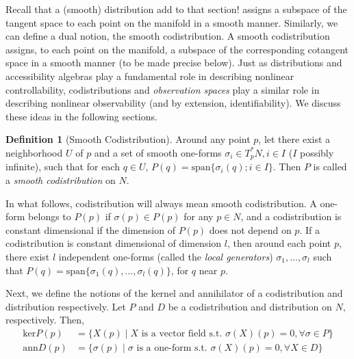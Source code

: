 \documentclass[psamsfonts]{amsart}
\theoremstyle{definition}
\newtheorem{defn}[thm]{Definition}
\theoremstyle{remark}
\numberwithin{equation}{section}
\begin{document}
Recall that a (smooth) distribution {\color{red}add to that section!} assigns a subspace of the tangent space to each point on the manifold in a smooth manner. Similarly, we can define a dual notion, the smooth codistribution. A smooth codistribution assigns, to each point on the manifold, a subspace of the corresponding cotangent space in a smooth manner (to be made precise below). Just as distributions and accessibility algebras play a fundamental role in describing nonlinear controllability, codistributions and \textit{observation spaces} play a similar role in describing nonlinear observability (and by extension, identifiability). We discuss these ideas in the following sections. 

\begin{defn}[Smooth Codistribution]
Around any point $p$, let there exist a neighborhood $U$ of $p$ and a set of smooth one-forms $\sigma_i \in T^*_pN, i\in I$ ($I$ possibly infinite), such that for each $q \in U$, $P(q) = \text{span}\{\sigma_i(q); i \in I\}$. Then $P$ is called a \textit{smooth codistribution }on $N$. 
\end{defn}

In what follows, codistribution will always mean smooth codistribution. A one-form belongs to $P(p)$ if $\sigma(p) \in P(p)$ for any $p\in N$, and a codistribution is constant dimensional if the dimension of $P(p)$ does not depend on $p$. If a codistribution is constant dimensional of dimension $l$, then around each point $p$, there exist $l$ independent one-forms (called the \textit{local generators}) $\sigma_1, \dots, \sigma_l$ such that $P(q) = \text{span}\{\sigma_1(q), \dots, \sigma_l(q)\}$, for $q$ near $p$. 

Next, we define the notions of the kernel and annihilator of a codistribution and distribution respectively. Let $P$ and $D$ be a codistribution and distribution on $N$, respectively. Then, 
\begin{equation}
    \begin{aligned}
        \text{ker}P(p) &={} \{X(p) \mid X \text{ is a vector field s.t. } \sigma(X)(p) = 0, \forall \sigma \in P\}\\
        \text{ann}D(p) &={} \{\sigma(p) \mid \sigma \text{ is a one-form s.t. } \sigma(X)(p) = 0, \forall X \in D\}
    \end{aligned}   
\end{equation}
\end{document}
